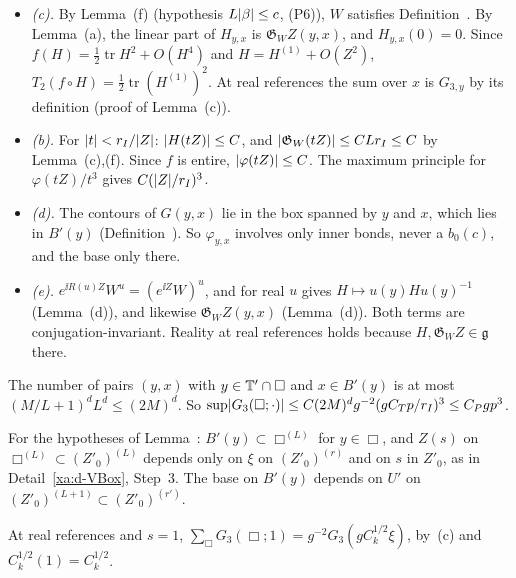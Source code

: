 \begin{detail}
\begin{step}[(a)--(e)]
\begin{itemize}
\item \emph{(c).} By Lemma~(f) (hypothesis $L\lvert\beta\rvert\le c$, (P6)), $W$ satisfies Definition~. By Lemma~(a), the linear part of $H_{y,x}$ is $\mathfrak G_WZ(y,x)$, and $H_{y,x}(0)=0$. Since $f(H)=\frac12\operatorname{tr}H^2+O(H^4)$ and $H=H^{(1)}+O(Z^2)$, $T_2(f\circ H)=\frac12\operatorname{tr}(H^{(1)})^2$. At real references the sum over $x$ is $G_{3,y}$ by its definition (proof of Lemma~(c)).
\item \emph{(b).} For $\lvert t\rvert<r_I/\lvert Z\rvert$: $\lvert H(tZ)\rvert\le C$, and $\lvert\mathfrak G_W(tZ)\rvert\le CLr_I\le C$ by Lemma~(c),(f). Since $f$ is entire, $\lvert\varphi(tZ)\rvert\le C$. The maximum principle for $\varphi(tZ)/t^3$ gives $C(\lvert Z\rvert/r_I)^3$.
\item \emph{(d).} The contours of $G(y,x)$ lie in the box spanned by $y$ and $x$, which lies in $B'(y)$ (Definition~). So $\varphi_{y,x}$ involves only inner bonds, never a $b_0(c)$, and the base only there.
\item \emph{(e).} $e^{\ii R(u)Z}W^u=(e^{\ii Z}W)^u$, and  for real $u$ gives $H\mapsto u(y)Hu(y)^{-1}$ (Lemma~(d)), and likewise $\mathfrak G_WZ(y,x)$ (Lemma~(d)). Both terms are conjugation-invariant. Reality at real references holds because $H,\mathfrak G_WZ\in\mathfrak g$ there.
\end{itemize}
\end{step}

\begin{step}[$G_3(\Box;s)$]
The number of pairs $(y,x)$ with $y\in\mathbb T'\cap\Box$ and $x\in B'(y)$ is at most $(M/L+1)^dL^d\le(2M)^d$. So $\sup\lvert G_3(\Box;\cdot)\rvert\le C(2M)^dg^{-2}(gC_Tp/r_I)^3\le C_Pgp^3$.

For the hypotheses of Lemma~: $B'(y)\subset\Box^{(L)}$ for $y\in\Box$, and $Z(s)$ on $\Box^{(L)}\subset(Z'_0)^{(L)}$ depends only on $\xi$ on $(Z'_0)^{(r)}$ and on $s$ in $Z'_0$, as in Detail~\ref{xa:d-VBox}, Step~3. The base on $B'(y)$ depends on $U'$ on $(Z'_0)^{(L+1)}\subset(Z'_0)^{(r')}$.

At real references and $s=1$, $\sum_\Box G_3(\Box;1)=g^{-2}G_3(gC_k^{1/2}\xi)$, by~(c) and $C_k^{1/2}(1)=C_k^{1/2}$.
\end{step}
\end{detail}

